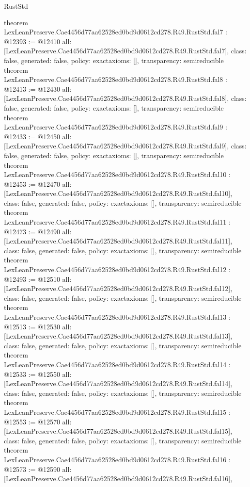 \begin{lexlean}{RustStd}
\begin{coremodule}
{}
theorem LexLeanPreserve.Cae4456d77aa62528ed0bd9d0612cd278.R49.RustStd.fal7 : @12393 := @12410 {
  all: [LexLeanPreserve.Cae4456d77aa62528ed0bd9d0612cd278.R49.RustStd.fal7],
  class: false,
  generated: false,
  policy: exact{axioms: []},
  transparency: semireducible
}
theorem LexLeanPreserve.Cae4456d77aa62528ed0bd9d0612cd278.R49.RustStd.fal8 : @12413 := @12430 {
  all: [LexLeanPreserve.Cae4456d77aa62528ed0bd9d0612cd278.R49.RustStd.fal8],
  class: false,
  generated: false,
  policy: exact{axioms: []},
  transparency: semireducible
}
theorem LexLeanPreserve.Cae4456d77aa62528ed0bd9d0612cd278.R49.RustStd.fal9 : @12433 := @12450 {
  all: [LexLeanPreserve.Cae4456d77aa62528ed0bd9d0612cd278.R49.RustStd.fal9],
  class: false,
  generated: false,
  policy: exact{axioms: []},
  transparency: semireducible
}
theorem LexLeanPreserve.Cae4456d77aa62528ed0bd9d0612cd278.R49.RustStd.fal10 : @12453 := @12470 {
  all: [LexLeanPreserve.Cae4456d77aa62528ed0bd9d0612cd278.R49.RustStd.fal10],
  class: false,
  generated: false,
  policy: exact{axioms: []},
  transparency: semireducible
}
theorem LexLeanPreserve.Cae4456d77aa62528ed0bd9d0612cd278.R49.RustStd.fal11 : @12473 := @12490 {
  all: [LexLeanPreserve.Cae4456d77aa62528ed0bd9d0612cd278.R49.RustStd.fal11],
  class: false,
  generated: false,
  policy: exact{axioms: []},
  transparency: semireducible
}
theorem LexLeanPreserve.Cae4456d77aa62528ed0bd9d0612cd278.R49.RustStd.fal12 : @12493 := @12510 {
  all: [LexLeanPreserve.Cae4456d77aa62528ed0bd9d0612cd278.R49.RustStd.fal12],
  class: false,
  generated: false,
  policy: exact{axioms: []},
  transparency: semireducible
}
theorem LexLeanPreserve.Cae4456d77aa62528ed0bd9d0612cd278.R49.RustStd.fal13 : @12513 := @12530 {
  all: [LexLeanPreserve.Cae4456d77aa62528ed0bd9d0612cd278.R49.RustStd.fal13],
  class: false,
  generated: false,
  policy: exact{axioms: []},
  transparency: semireducible
}
theorem LexLeanPreserve.Cae4456d77aa62528ed0bd9d0612cd278.R49.RustStd.fal14 : @12533 := @12550 {
  all: [LexLeanPreserve.Cae4456d77aa62528ed0bd9d0612cd278.R49.RustStd.fal14],
  class: false,
  generated: false,
  policy: exact{axioms: []},
  transparency: semireducible
}
theorem LexLeanPreserve.Cae4456d77aa62528ed0bd9d0612cd278.R49.RustStd.fal15 : @12553 := @12570 {
  all: [LexLeanPreserve.Cae4456d77aa62528ed0bd9d0612cd278.R49.RustStd.fal15],
  class: false,
  generated: false,
  policy: exact{axioms: []},
  transparency: semireducible
}
theorem LexLeanPreserve.Cae4456d77aa62528ed0bd9d0612cd278.R49.RustStd.fal16 : @12573 := @12590 {
  all: [LexLeanPreserve.Cae4456d77aa62528ed0bd9d0612cd278.R49.RustStd.fal16],
}
\end{coremodule}
\end{lexlean}
